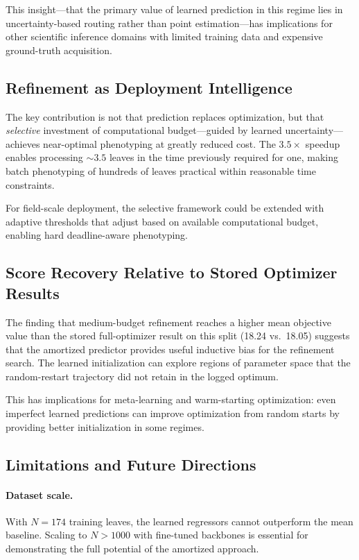 \documentclass[11pt,a4paper]{article}
\begin{document}
This insight---that the primary value of learned prediction in this regime
lies in uncertainty-based routing rather than point estimation---has
implications for other scientific inference domains with limited
training data and expensive ground-truth acquisition.

\subsection{Refinement as Deployment Intelligence}

The key contribution is not that prediction replaces optimization,
but that \emph{selective} investment of computational budget---guided
by learned uncertainty---achieves near-optimal phenotyping at greatly
reduced cost. The $3.5\times$ speedup enables processing ${\sim}3.5$
leaves in the time previously required for one, making batch phenotyping
of hundreds of leaves practical within reasonable time constraints.

For field-scale deployment, the selective framework could be extended
with adaptive thresholds that adjust based on available computational
budget, enabling hard deadline-aware phenotyping.

\subsection{Score Recovery Relative to Stored Optimizer Results}

The finding that medium-budget refinement reaches a higher mean objective
value than the stored full-optimizer result on this split (18.24 vs.\ 18.05)
suggests that the amortized predictor provides useful inductive bias for the
refinement search. The learned initialization can explore regions of parameter
space that the random-restart trajectory did not retain in the logged optimum.

This has implications for meta-learning and warm-starting optimization:
even imperfect learned predictions can improve optimization from random starts
by providing better initialization in some regimes.

\subsection{Limitations and Future Directions}

\paragraph{Dataset scale.}
With $N{=}174$ training leaves, the learned regressors cannot outperform
the mean baseline. Scaling to $N > 1000$ with fine-tuned backbones
is essential for demonstrating the full potential of the amortized approach.
\end{document}
